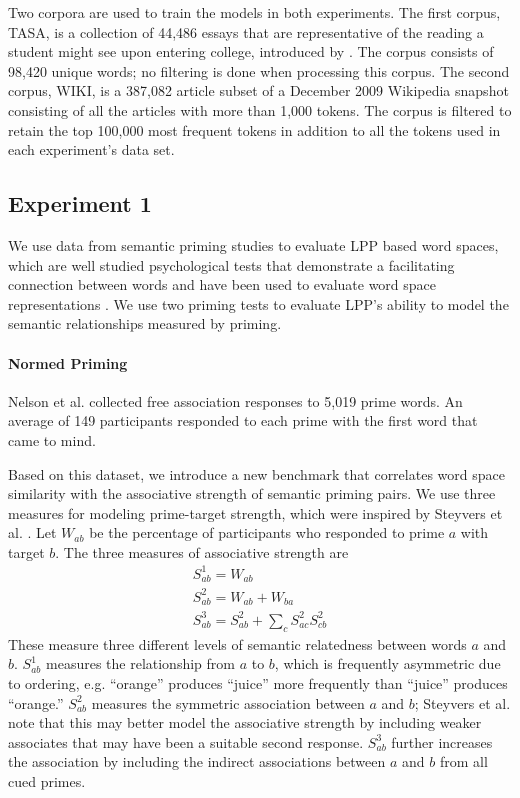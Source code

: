 \documentclass[11pt]{article}
\begin{document}
Two corpora are used to train the models in both experiments.  The first corpus,
TASA, is a collection of 44,486 essays that are representative of the reading
a student might see upon entering college, introduced by
\cite{landauer97solution}.  The corpus consists of 98,420 unique words; no
filtering is done when processing this corpus.  The second corpus, WIKI, is a
387,082 article subset of a December 2009 Wikipedia snapshot consisting of all
the articles with more than 1,000 tokens.  The corpus is filtered to retain
the top 100,000 most frequent tokens in addition to all the tokens used in
each experiment's data set.

\subsection{Experiment 1}

We use data from semantic priming studies to evaluate LPP based word spaces,
which are well studied psychological tests that demonstrate a facilitating
connection between words and have been used to evaluate word space
representations \cite{pado07dependency}.  We use two priming tests to evaluate
LPP's ability to model the semantic relationships measured by priming.

\paragraph{Normed Priming} Nelson et al.  collected 
free association responses to 5,019 prime words.  An average of 149 participants
responded to each prime with the first word that came to mind.

Based on this dataset, we introduce a new benchmark that correlates word space
similarity with the associative strength of semantic priming pairs.  We use
three measures for modeling prime-target strength, which were inspired by
Steyvers et al. .  Let $W_{ab}$ be the percentage of
participants who responded to prime $a$ with target $b$. The three measures of
associative strength are
\[
\begin{array}{l}
S^1_{ab} = W_{ab} \\
S^2_{ab} = W_{ab} + W_{ba} \\
S^3_{ab} = S^2_{ab} + \sum_c S^2_{ac} S^2_{cb} 
\end{array}
\]
These measure three different levels of semantic relatedness between words $a$
and $b$.  $S^1_{ab}$ measures the relationship from $a$ to $b$, which is
frequently asymmetric due to ordering, e.g. ``orange'' produces ``juice'' more
frequently than ``juice'' produces ``orange.''  $S^2_{ab}$ measures the
symmetric association between $a$ and $b$; Steyvers et
al.  note that this may better model the associative
strength by including weaker associates that may have been a suitable second
response.  $S^3_{ab}$ further increases the association by including the
indirect associations between $a$ and $b$ from all cued primes.
\end{document}
